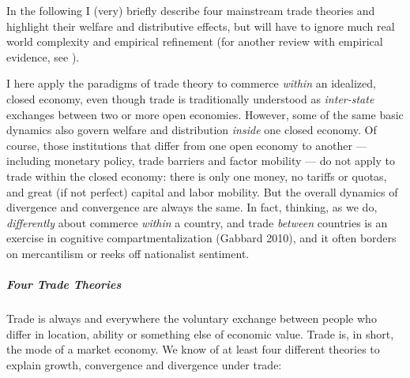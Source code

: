 In the following I (very) briefly describe four mainstream trade theories and highlight their welfare and distributive effects, but will have to ignore much real world complexity and empirical refinement (for another review with empirical evidence, see \citealt{Beckfield2009}).

I here apply the paradigms of trade theory to commerce \emph{within} an idealized, closed economy, even though trade is traditionally understood as \emph{inter-state} exchanges between two or more open economies. However, some of the same basic dynamics also govern welfare and distribution \emph{inside} one closed economy. Of course, those institutions that differ from one open economy to another --- including monetary policy, trade barriers and factor mobility --- do not apply to trade within the closed economy: there is only one money, no tariffs or quotas, and great (if not perfect) capital and labor mobility. But the overall dynamics of divergence and convergence are always the same. In fact, thinking, as we do, \emph{differently} about commerce \emph{within} a country, and trade \emph{between} countries is an exercise in cognitive compartmentalization (Gabbard 2010), and it often borders on mercantilism or reeks off nationalist sentiment. 

\subparagraph{Four Trade Theories}  \label{sec:trade-theories} Trade is always and everywhere the voluntary exchange between people who differ in location, ability or something else of economic value. Trade is, in short, the mode of a market economy. We know of at least four different theories to explain growth, convergence and divergence under trade:

